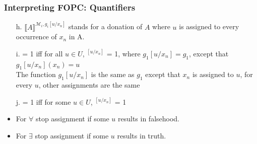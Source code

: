 \documentclass{beamer}
\newcommand{\evaluation}[2][]{\ensuremath{\llbracket #2\rrbracket^{#1}}}
\begin{document}





\begin{frame}

\frametitle{Interpreting FOPC: Quantifiers}

\begin{itemize}[<+->]

\item[h.] \evaluation[\mathcal{M}_i,g_i{[u/x_n]}]{A} stands for a donation of $A$ where $u$ is assigned to every occurrence of $x_n$ in A.

\item[i.]  = 1 iff for all $u \in U$, $^{[u/x_n]}$ = 1, where $g_1[u/x_n] = g_1$, except that $g_1[u/x_n](x_n) = u$ \\
The function $g_1[u/x_n]$ is the same as $g_1$ except that $x_n$ is assigned to $u$, for every $u$, other assignments are the same 
\item[j.]  = 1 iff for some $u \in U$, $^{[u/x_n]}$ = 1

\item \bigskip For $\forall$ stop assignment if some $u$ results in falsehood.

\item For  $\exists$ stop assignment if some $u$ results in truth.

\end{itemize}

\end{frame}
\end{document}
